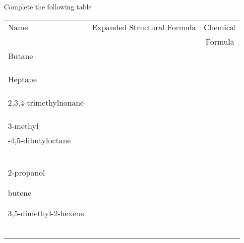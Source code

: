 \documentclass[addpoints, 12pt]{exam}
\begin{document}
\begin{questions}

\newpage
\question[25] Complete the following table

\begin{tabular}{l|c|c}
Name & \hspace{1.5cm} Expanded Structural Formula     \hspace{1.5cm}        & Chemical \\
& & Formula \\
\hline
Butane & & \\
 & & \\
 & & \\
 & & \\
\hline
Heptane & & \\
& & \\ & & \\ & & \\ \hline
2,3,4-trimethylnonane & & \\
& & \\ & & \\ & & \\ \hline
3-methyl & & \\
  -4,5-dibutyloctane & & \\
& & \\ & & \\ & & \\ & & \\ & & \\ & & \\ \hline
2-propanol
& & \\ & & \\ & & \\ \hline
butene
& & \\ & & \\ & & \\ \hline
3,5-dimethyl-2-hexene & & \\
& & \\ & & \\ & & \\ 
& & \\ & & \\ & & \\\hline
\end{tabular}



\end{questions}
\end{document}
